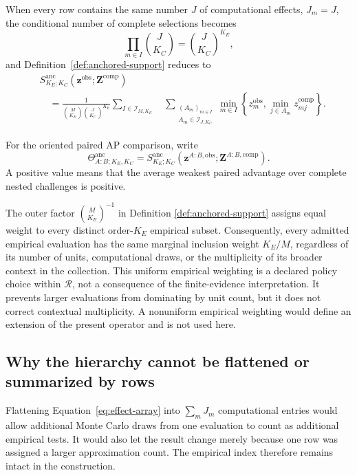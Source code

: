 \documentclass[11pt]{article}
\newcommand{\Regime}{\mathcal{R}}
\newcommand{\Sanc}{S^{\mathrm{anc}}}
\newcommand{\Thetaanc}{\Theta^{\mathrm{anc}}}
\theoremstyle{remark}
\begin{document}
When every row contains the same number $J$ of computational effects,
$J_m=J$, the conditional number of complete selections becomes
\[
\prod_{m\in I}\binom{J}{K_C}
=
\binom{J}{K_C}^{K_E},
\]
and Definition~\ref{def:anchored-support} reduces to
\begin{align*}
&\Sanc_{K_E;K_C}
\left(\mathbf z^{\mathrm{obs}};\mathbf Z^{\mathrm{comp}}\right)\\
&\quad=
\frac{1}{\binom{M}{K_E}\binom{J}{K_C}^{K_E}}
\sum_{I\in\mathcal I_{M,K_E}}
\quad
\sum_{\substack{
(A_m)_{m\in I}\\
A_m\in\mathcal I_{J,K_C}}}
\min_{m\in I}
\left\{
z_m^{\mathrm{obs}},
\min_{j\in A_m}z_{mj}^{\mathrm{comp}}
\right\}.
\end{align*}

For the oriented paired AP comparison, write
\begin{equation}
\Thetaanc_{A:B;K_E,K_C}
=
\Sanc_{K_E;K_C}
\left(
\mathbf z^{A:B,\mathrm{obs}};
\mathbf Z^{A:B,\mathrm{comp}}
\right).
\label{eq:anchored-paired-support}
\end{equation}
A positive value means that the average weakest paired advantage over complete
nested challenges is positive.

The outer factor $\binom{M}{K_E}^{-1}$ in Definition
\ref{def:anchored-support} assigns equal weight to every distinct order-$K_E$
empirical subset. Consequently, every admitted empirical evaluation has the
same marginal inclusion weight $K_E/M$, regardless of its number of units,
computational draws, or the multiplicity of its broader context in the
collection. This uniform empirical weighting is a declared policy choice
within $\Regime$, not a consequence of the finite-evidence interpretation. It
prevents larger evaluations from dominating by unit count, but it does not
correct contextual multiplicity. A nonuniform empirical weighting would define
an extension of the present operator and is not used here.

\subsection{Why the hierarchy cannot be flattened or summarized by rows}

Flattening Equation~\eqref{eq:effect-array} into $\sum_mJ_m$ computational
entries would allow additional Monte Carlo draws from one evaluation to count
as additional empirical tests. It would also let the result change merely
because one row was assigned a larger approximation count. The empirical
index therefore remains intact in the construction.
\end{document}
